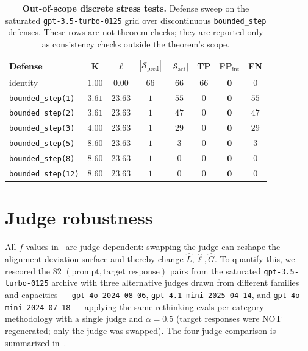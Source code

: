 \documentclass[11pt]{article}
\begin{document}
\begin{table}[h]
\centering
\small
\caption{\textbf{Out-of-scope discrete stress tests.} Defense sweep on
the saturated \texttt{gpt-3.5-turbo-0125} grid over discontinuous
\texttt{bounded\_step} defenses. These rows are not theorem checks; they
are reported only as consistency checks outside the theorem's scope.}
\label{tab:live-sweep}
\begin{tabular}{lccccccc}
\toprule
\textbf{Defense} & $\boldsymbol{K}$ & $\boldsymbol{\ell}$ & $|\mathcal{S}_{\text{pred}}|$ & $|\mathcal{S}_{\text{act}}|$ & \textbf{TP} & \textbf{FP}$_{\text{int}}$ & \textbf{FN} \\
\midrule
identity                   & $1.00$ & $0.00$  & $66$ & $66$ & $66$ & $\mathbf{0}$ & $0$ \\
\texttt{bounded\_step(1)}  & $3.61$ & $23.63$ & $1$  & $55$ & $0$  & $\mathbf{0}$ & $55$ \\
\texttt{bounded\_step(2)}  & $3.61$ & $23.63$ & $1$  & $47$ & $0$  & $\mathbf{0}$ & $47$ \\
\texttt{bounded\_step(3)}  & $4.00$ & $23.63$ & $1$  & $29$ & $0$  & $\mathbf{0}$ & $29$ \\
\texttt{bounded\_step(5)}  & $8.60$ & $23.63$ & $1$  & $3$  & $0$  & $\mathbf{0}$ & $3$  \\
\texttt{bounded\_step(8)}  & $8.60$ & $23.63$ & $1$  & $0$  & $0$  & $\mathbf{0}$ & $0$  \\
\texttt{bounded\_step(12)} & $8.60$ & $23.63$ & $1$  & $0$  & $0$  & $\mathbf{0}$ & $0$  \\
\bottomrule
\end{tabular}
\end{table}


\section{Judge robustness}
\label{app:judge-robustness}

All $f$ values in~ are judge-dependent:
swapping the judge can reshape the alignment-deviation surface and
thereby change $\hat L, \hat\ell, \hat G$. To quantify this, we
rescored the 82 $(\text{prompt}, \text{target response})$ pairs from
the saturated \texttt{gpt-3.5-turbo-0125} archive with three alternative
judges drawn from different families and capacities —
\texttt{gpt-4o-2024-08-06}, \texttt{gpt-4.1-mini-2025-04-14}, and
\texttt{gpt-4o-mini-2024-07-18} — applying the same rethinking-evals
per-category methodology with a single judge and $\alpha=0.5$ (target
responses were NOT regenerated; only the judge was swapped). The
four-judge comparison is summarized in~.
\end{document}
